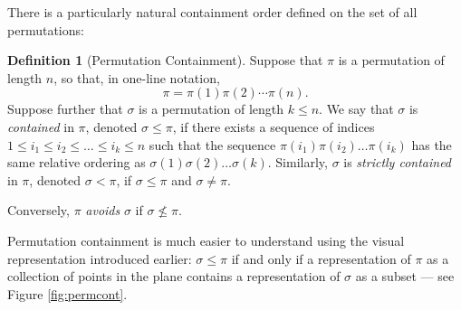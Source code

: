 \documentclass[11pt,a4paper]{article}
\theoremstyle{definition}
\newtheorem{defn}[thm]{Definition}
\begin{document}
There is a particularly natural containment order defined on the set of all permutations:
\begin{defn}[Permutation Containment]
Suppose that $\pi$ is a permutation of length $n$, so that, in one-line notation,
\[
\pi = \pi(1) \pi(2) \cdots \pi(n).
\]
Suppose further that $\sigma$ is a permutation of length $k \leq n$. We say that $\sigma$ is \emph{contained} in $\pi$, denoted $\sigma \leq \pi$, if there exists a sequence of indices $1 \leq i_{1} \leq i_{2} \leq \dots \leq i_{k} \leq n$ such that the sequence $\pi(i_{1})\pi(i_{2}) \dots \pi(i_{k})$ has the same relative ordering as $\sigma(1)\sigma(2) \dots \sigma(k)$. Similarly, $\sigma$ is \emph{strictly contained} in $\pi$, denoted $\sigma < \pi$, if $\sigma \leq \pi$ and $\sigma \neq \pi$.

Conversely, $\pi$ \emph{avoids} $\sigma$ if $\sigma\nleq \pi$.
\end{defn}
Permutation containment is much easier to understand using the visual representation introduced earlier: $\sigma \leq \pi$ if and only if a representation of $\pi$ as a collection of points in the plane contains a representation of $\sigma$ as a subset --- see Figure \ref{fig:permcont}.
\end{document}
